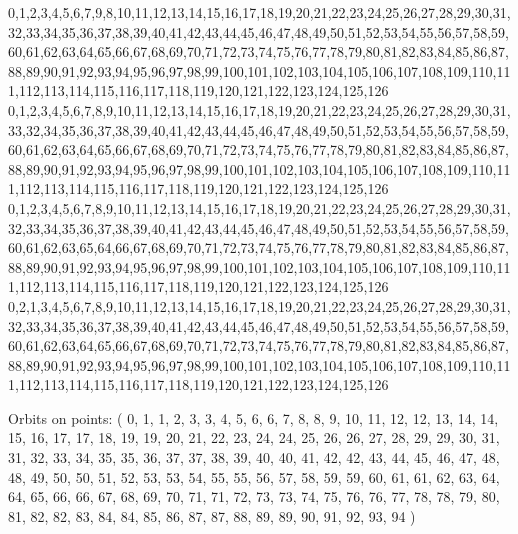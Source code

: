 \documentclass[12pt]{article}
\begin{document}
{0,1,2,3,4,5,6,7,9,8,10,11,12,13,14,15,16,17,18,19,20,21,22,23,24,25,26,27,28,29,30,31,32,33,34,35,36,37,38,39,40,41,42,43,44,45,46,47,48,49,50,51,52,53,54,55,56,57,58,59,60,61,62,63,64,65,66,67,68,69,70,71,72,73,74,75,76,77,78,79,80,81,82,83,84,85,86,87,88,89,90,91,92,93,94,95,96,97,98,99,100,101,102,103,104,105,106,107,108,109,110,111,112,113,114,115,116,117,118,119,120,121,122,123,124,125,126\\
0,1,2,3,4,5,6,7,8,9,10,11,12,13,14,15,16,17,18,19,20,21,22,23,24,25,26,27,28,29,30,31,33,32,34,35,36,37,38,39,40,41,42,43,44,45,46,47,48,49,50,51,52,53,54,55,56,57,58,59,60,61,62,63,64,65,66,67,68,69,70,71,72,73,74,75,76,77,78,79,80,81,82,83,84,85,86,87,88,89,90,91,92,93,94,95,96,97,98,99,100,101,102,103,104,105,106,107,108,109,110,111,112,113,114,115,116,117,118,119,120,121,122,123,124,125,126\\
0,1,2,3,4,5,6,7,8,9,10,11,12,13,14,15,16,17,18,19,20,21,22,23,24,25,26,27,28,29,30,31,32,33,34,35,36,37,38,39,40,41,42,43,44,45,46,47,48,49,50,51,52,53,54,55,56,57,58,59,60,61,62,63,65,64,66,67,68,69,70,71,72,73,74,75,76,77,78,79,80,81,82,83,84,85,86,87,88,89,90,91,92,93,94,95,96,97,98,99,100,101,102,103,104,105,106,107,108,109,110,111,112,113,114,115,116,117,118,119,120,121,122,123,124,125,126\\
0,2,1,3,4,5,6,7,8,9,10,11,12,13,14,15,16,17,18,19,20,21,22,23,24,25,26,27,28,29,30,31,32,33,34,35,36,37,38,39,40,41,42,43,44,45,46,47,48,49,50,51,52,53,54,55,56,57,58,59,60,61,62,63,64,65,66,67,68,69,70,71,72,73,74,75,76,77,78,79,80,81,82,83,84,85,86,87,88,89,90,91,92,93,94,95,96,97,98,99,100,101,102,103,104,105,106,107,108,109,110,111,112,113,114,115,116,117,118,119,120,121,122,123,124,125,126\\

\bigskip

Orbits on points: ( 0, 1, 1, 2, 3, 3, 4, 5, 6, 6, 7, 8, 8, 9, 10, 11, 12, 12, 13, 14, 14, 15, 16, 17, 17, 18, 19, 19, 20, 21, 22, 23, 24, 24, 25, 26, 26, 27, 28, 29, 29, 30, 31, 31, 32, 33, 34, 35, 35, 36, 37, 37, 38, 39, 40, 40, 41, 42, 42, 43, 44, 45, 46, 47, 48, 48, 49, 50, 50, 51, 52, 53, 53, 54, 55, 55, 56, 57, 58, 59, 59, 60, 61, 61, 62, 63, 64, 64, 65, 66, 66, 67, 68, 69, 70, 71, 71, 72, 73, 73, 74, 75, 76, 76, 77, 78, 78, 79, 80, 81, 82, 82, 83, 84, 84, 85, 86, 87, 87, 88, 89, 89, 90, 91, 92, 93, 94 )\\


%


%


}%
\end{document}
